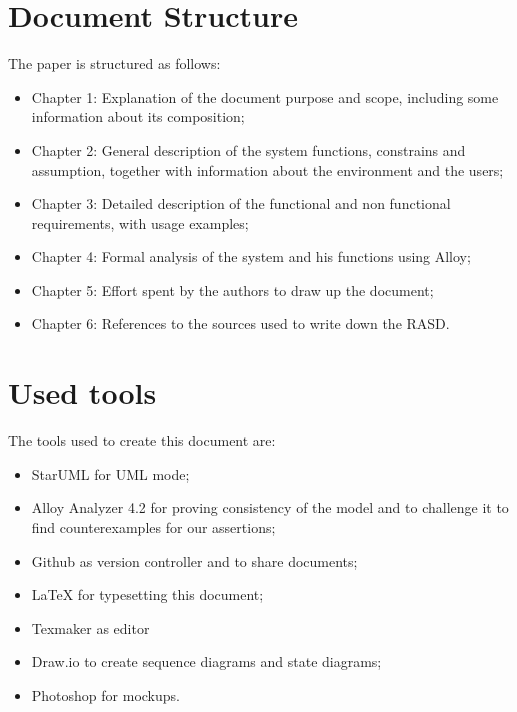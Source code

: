 \section{Document Structure}
The paper is structured as follows:
\begin{itemize}
\item Chapter 1: Explanation of the document purpose and scope, including some information about its composition;
\item Chapter 2: General description of the system functions, constrains and assumption, together with information about the environment and the users;
\item Chapter 3: Detailed description of the functional and non functional requirements, with usage examples;
\item Chapter 4: Formal analysis of the system and his functions using Alloy;
\item Chapter 5: Effort spent by the authors to draw up the document;
\item Chapter 6: References to the sources used to write down the RASD.
\end{itemize}
%
%
\section{Used tools}
The tools used to create this document are:
\begin{itemize}
\item StarUML for UML mode;
\item Alloy Analyzer 4.2 for proving consistency of the model and to challenge it to find counterexamples for our assertions;
\item Github as version controller and to share documents;
\item LaTeX for typesetting this document;
\item Texmaker as editor
\item Draw.io to create sequence diagrams and state diagrams;
\item Photoshop for mockups.
\end{itemize}
%
